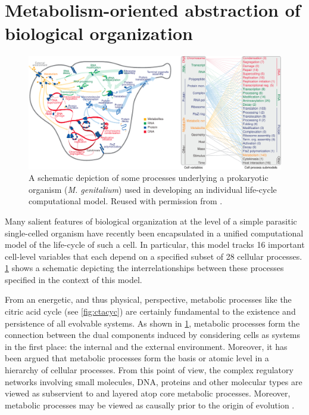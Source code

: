 \documentclass[10pt]{article}
\theoremstyle{plain}
\theoremstyle{definition}
\theoremstyle{remark}
\begin{document}
\section{Metabolism-oriented abstraction of biological organization}\label{sec:metabolismabstraction}
\begin{figure}
\begin{center}
\noindent\includegraphics[width=0.95\columnwidth]{fig/cellprocessesdiagram.pdf}
\end{center}
\caption[Cell model]{A schematic depiction of some processes underlying a prokaryotic organism (\emph{M. genitalium}) used in developing an individual life-cycle computational model. Reused with permission from \cite{Karr2012}.}
\label{fig:cellprocess}
\end{figure}
Many salient features of biological organization at the level of a simple parasitic single-celled organism have recently been encapsulated in a unified computational model of the life-cycle of such a cell. In particular, this model tracks 16 important cell-level variables that each depend on a specified subset of 28 cellular processes. \ref{fig:cellprocess} shows a schematic depicting the interrelationships between these processes specified in the context of this model.

From an energetic, and thus physical, perspective, metabolic processes like the citric acid cycle (see \ref{fig:ctacyc}) are certainly fundamental to the existence and persistence of all evolvable systems. As shown in \ref{fig:cellprocess}, metabolic processes form the connection between the dual components induced by considering cells as systems in the first place: the internal and the external environment. Moreover, it has been argued that metabolic processes form the basis or atomic level in a hierarchy of cellular processes. From this point of view, the complex regulatory networks involving small molecules, DNA, proteins and other molecular types are viewed as subservient to and layered atop core metabolic processes. Moreover, metabolic processes may be viewed as causally prior to the origin of evolution \cite{Braakman2012,Braakman2012a}.
\end{document}
